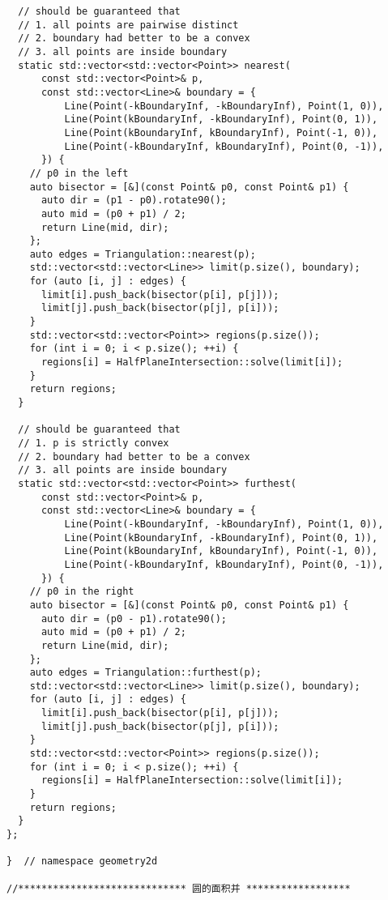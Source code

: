 \documentclass{article}
\begin{document}
\begin{multicols}{2}
\begin{lstlisting}
  // should be guaranteed that
  // 1. all points are pairwise distinct
  // 2. boundary had better to be a convex
  // 3. all points are inside boundary
  static std::vector<std::vector<Point>> nearest(
      const std::vector<Point>& p,
      const std::vector<Line>& boundary = {
          Line(Point(-kBoundaryInf, -kBoundaryInf), Point(1, 0)),
          Line(Point(kBoundaryInf, -kBoundaryInf), Point(0, 1)),
          Line(Point(kBoundaryInf, kBoundaryInf), Point(-1, 0)),
          Line(Point(-kBoundaryInf, kBoundaryInf), Point(0, -1)),
      }) {
    // p0 in the left
    auto bisector = [&](const Point& p0, const Point& p1) {
      auto dir = (p1 - p0).rotate90();
      auto mid = (p0 + p1) / 2;
      return Line(mid, dir);
    };
    auto edges = Triangulation::nearest(p);
    std::vector<std::vector<Line>> limit(p.size(), boundary);
    for (auto [i, j] : edges) {
      limit[i].push_back(bisector(p[i], p[j]));
      limit[j].push_back(bisector(p[j], p[i]));
    }
    std::vector<std::vector<Point>> regions(p.size());
    for (int i = 0; i < p.size(); ++i) {
      regions[i] = HalfPlaneIntersection::solve(limit[i]);
    }
    return regions;
  }

  // should be guaranteed that
  // 1. p is strictly convex
  // 2. boundary had better to be a convex
  // 3. all points are inside boundary
  static std::vector<std::vector<Point>> furthest(
      const std::vector<Point>& p,
      const std::vector<Line>& boundary = {
          Line(Point(-kBoundaryInf, -kBoundaryInf), Point(1, 0)),
          Line(Point(kBoundaryInf, -kBoundaryInf), Point(0, 1)),
          Line(Point(kBoundaryInf, kBoundaryInf), Point(-1, 0)),
          Line(Point(-kBoundaryInf, kBoundaryInf), Point(0, -1)),
      }) {
    // p0 in the right
    auto bisector = [&](const Point& p0, const Point& p1) {
      auto dir = (p0 - p1).rotate90();
      auto mid = (p0 + p1) / 2;
      return Line(mid, dir);
    };
    auto edges = Triangulation::furthest(p);
    std::vector<std::vector<Line>> limit(p.size(), boundary);
    for (auto [i, j] : edges) {
      limit[i].push_back(bisector(p[i], p[j]));
      limit[j].push_back(bisector(p[j], p[i]));
    }
    std::vector<std::vector<Point>> regions(p.size());
    for (int i = 0; i < p.size(); ++i) {
      regions[i] = HalfPlaneIntersection::solve(limit[i]);
    }
    return regions;
  }
};

}  // namespace geometry2d

//***************************** 圆的面积并 ******************


\end{lstlisting}
\end{multicols}
\end{document}
